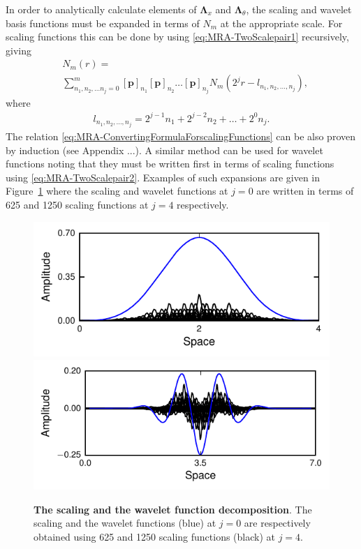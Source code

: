 \documentclass[11pt,draftcls,onecolumn,peerreview]{IEEEtran}
\begin{document}
In order to analytically calculate elements of $\boldsymbol\Lambda_{x}$ and $\boldsymbol\Lambda_{\theta}$, the scaling and wavelet basis functions must be expanded in terms of $N_m$ at the appropriate scale. For scaling functions this can be done  by using \eqref{eq:MRA-TwoScalepair1} recursively, giving
\begin{align}\label{eq:MRA-ConvertingFormulaForscalingFunctions}
 &N_m(r)=\nonumber \\
&\sum_{n_1,n_2, \dots n_j=0}^{m}\left[\mathbf p\right]_{n_1} \left[\mathbf p\right]_{n_2}\dots \left[\mathbf p\right]_{n_j}N_m(2^jr-l_{n_1,n_2, \dots, n_j}),
\end{align}
where 
\begin{align}
 l_{n_1,n_2, \dots, n_j}=2^{j-1}n_1+2^{j-2}n_2+ \dots +2^{0}n_j.
\end{align}
The relation \eqref{eq:MRA-ConvertingFormulaForscalingFunctions} can be also proven by induction (see Appendix ...). A similar method can be used for wavelet functions noting that they must be written first in terms of scaling functions using \eqref{eq:MRA-TwoScalepair2}. Examples of such expansions are given in Figure~\ref{fig:MRA-BasisDecomposition} where the scaling and wavelet functions at $j=0$ are written in terms of 625 and 1250 scaling functions at $j=4$ respectively.
\begin{figure}[!h] 
 	\centering
 		\includegraphics[scale=1]{./Graph/ScaleDecomposition.pdf}\\
 		\includegraphics[scale=1]{./Graph/WaveletDecomposition.pdf}
 		\caption{{\bf The scaling and the wavelet function decomposition}. The scaling and the wavelet functions (blue) at $j=0$ are respectively obtained using 625 and 1250 scaling functions (black) at $j=4$.}
 	\label{fig:MRA-BasisDecomposition}
 \end{figure}  
\end{document}
